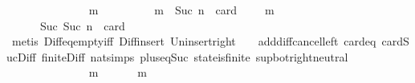 \begin{isabellebody}
\ \ \ \ \ \ \ \ \ \ \ \ \isamarkupfalse%
\ {\isachardoublequoteopen}{\isasymforall}\ m\ {\isasymin}\ {\isasymsigma}\ {\isacharminus}\ {\isasymsigma}{\isacharprime}{\isachardot}\ {\isasymnot}\ {\isasymsigma}\ {\isasymsubseteq}\ {\isasymsigma}{\isacharprime}\ {\isasymunion}\ {\isacharbraceleft}m{\isacharbraceright}\ {\isasymand}\ Suc\ n\ {\isacharequal}\ card\ {\isacharparenleft}{\isasymsigma}\ {\isacharminus}\ {\isacharparenleft}{\isasymsigma}{\isacharprime}\ {\isasymunion}\ {\isacharbraceleft}m{\isacharbraceright}{\isacharparenright}{\isacharparenright}{\isachardoublequoteclose}\isanewline
\ \ \ \ \ \ \ \ \ \ \ \ \ \ \isamarkupfalse%
\ {\isacartoucheopen}{\isasymnot}\ {\isasymsigma}\ {\isasymsubseteq}\ {\isasymsigma}{\isacharprime}\ {\isasymand}\ Suc\ {\isacharparenleft}Suc\ n{\isacharparenright}\ {\isacharequal}\ card\ {\isacharparenleft}{\isasymsigma}\ {\isacharminus}\ {\isasymsigma}{\isacharprime}{\isacharparenright}{\isacartoucheclose}\ \isanewline
\ \ \ \ \ \ \ \ \ \ \ \ \ \ \isamarkupfalse%
\ {\isacharparenleft}metis\ Diff{\isacharunderscore}eq{\isacharunderscore}empty{\isacharunderscore}iff\ Diff{\isacharunderscore}insert\ Un{\isacharunderscore}insert{\isacharunderscore}right\ {\isacartoucheopen}{\isasymsigma}\ {\isasymin}\ {\isasymSigma}{\isacartoucheclose}\ add{\isacharunderscore}diff{\isacharunderscore}cancel{\isacharunderscore}left{\isacharprime}\ card{\isacharunderscore}{}{\isacharunderscore}eq\ card{\isacharunderscore}Suc{\isacharunderscore}Diff{}\ finite{\isacharunderscore}Diff\ nat{\isachardot}simps{\isacharparenleft}{}{\isacharparenright}\ plus{\isacharunderscore}{}{\isacharunderscore}eq{\isacharunderscore}Suc\ state{\isacharunderscore}is{\isacharunderscore}finite\ sup{\isacharunderscore}bot{\isachardot}right{\isacharunderscore}neutral{\isacharparenright}\isanewline
\ \ \ \ \ \ \ \ \ \ \ \ \isamarkupfalse%
\ {\isachardoublequoteopen}{\isasymexists}\ m\ {\isasymin}\ {\isasymsigma}\ {\isacharminus}\ {\isasymsigma}{\isacharprime}{\isachardot}\ {\isasymsigma}{\isacharprime}\ {\isasymunion}\ {\isacharbraceleft}m{\isacharbraceright}\ {\isasymin}\ {\isasymSigma}{\isachardoublequoteclose}\isanewline
\ \ \ \ \ \ \ \ \ \ \ \ \ \ \isamarkupfalse%

\end{isabellebody}

